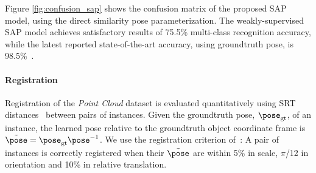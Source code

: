 
Figure \ref{fig:confusion_sap} shows the confusion matrix of the proposed SAP model, using the direct similarity pose parameterization.  
The weakly-supervised SAP model achieves satisfactory results of 75.5\% multi-class recognition accuracy, while the latest reported state-of-the-art accuracy, using groundtruth pose, is 98.5\%~\cite{Woodford2013}. %

\paragraph{Registration} 
\label{sec:3dreg}
Registration of the \emph{Point Cloud} dataset is evaluated quantitatively using SRT distances~\cite{Pham2011} between pairs of instances. Given the groundtruth pose, $\pose_\mathrm{gt}$, of an instance, the learned pose relative to the groundtruth object coordinate frame is $\tilde{\pose} = \pose_\mathrm{gt}\pose^{-1}$. We use the registration criterion of~\cite{Pham2011}: A pair of instances is correctly registered when their $\tilde{\pose}$ are within 5\% in scale, $\pi$/12 in orientation and 10\% in relative translation.

